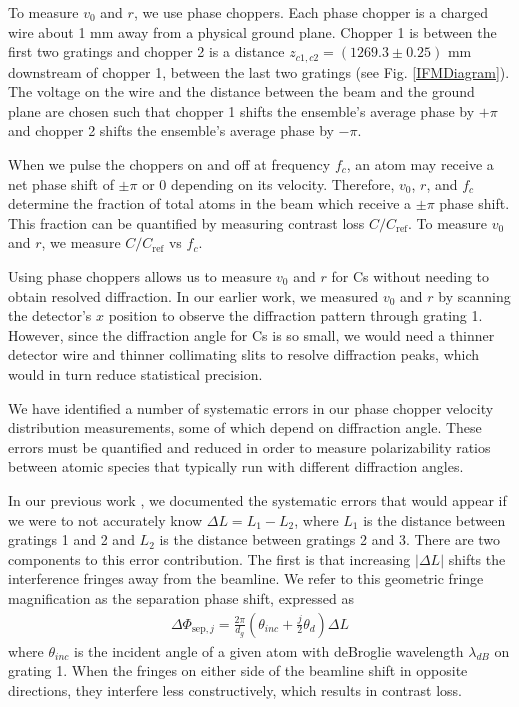 \documentclass[twocolumn,prl,showpacs,superscriptaddress]{revtex4-1}   %
\newcommand{\figref}[1]{Fig. \ref{#1}}
\newcommand{\dphisepj}{\Delta\Phi_{\mathrm{sep},j}}
\begin{document}
To measure $v_0$ and $r$, we use phase choppers. Each phase chopper is a charged wire about 1 mm away from a physical ground plane. Chopper 1 is between the first two gratings and chopper 2 is a distance $z_{c1,c2} = (1269.3 \pm 0.25)$ mm downstream of chopper 1, between the last two gratings (see \figref{IFMDiagram}). The voltage on the wire and the distance between the beam and the ground plane are chosen such that chopper 1 shifts the ensemble's average phase by $+\pi$ and chopper 2 shifts the ensemble's average phase by $-\pi$. 

When we pulse the choppers on and off at frequency $f_c$, an atom may receive a net phase shift of $\pm\pi$ or $0$ depending on its velocity. Therefore, $v_0$, $r$, and $f_c$ determine the fraction of total atoms in the beam which receive a $\pm\pi$ phase shift. This fraction can be quantified by measuring contrast loss $C/C_{\mathrm{ref}}$. To measure $v_0$ and $r$, we measure $C/C_{\mathrm{ref}}$ vs $f_c$.

Using phase choppers allows us to measure $v_0$ and $r$ for Cs without needing to obtain resolved diffraction. In our earlier work, we measured $v_0$ and $r$ by scanning the detector's $x$ position to observe the diffraction pattern through grating 1. However, since the diffraction angle for Cs is so small, we would need a thinner detector wire and thinner collimating slits to resolve diffraction peaks, which would in turn reduce statistical precision.

We have identified a number of systematic errors in our phase chopper velocity distribution measurements, some of which depend on diffraction angle. These errors must be quantified and reduced in order to measure polarizability ratios between atomic species that typically run with different diffraction angles.

In our previous work \cite{Hromada2014}, we documented the systematic errors that would appear if we were to not accurately know $\Delta L = L_1 - L_2$, where $L_1$ is the distance between gratings 1 and 2 and $L_2$ is the distance between gratings 2 and 3. There are two components to this error contribution. The first is that increasing $|\Delta L|$ shifts the interference fringes away from the beamline. We refer to this geometric fringe magnification as the separation phase shift, expressed as
\begin{align}
	\dphisepj = \frac{2\pi}{d_g}
	\left(
		\theta_{inc} + \frac{j}{2}\theta_d
	\right) \Delta L
	\label{phiSep}
\end{align}
where $\theta_{inc}$ is the incident angle of a given atom with deBroglie wavelength $\lambda_{dB}$ on grating 1.
When the fringes on either side of the beamline shift in opposite directions, they interfere less constructively, which results in contrast loss.
\end{document}
